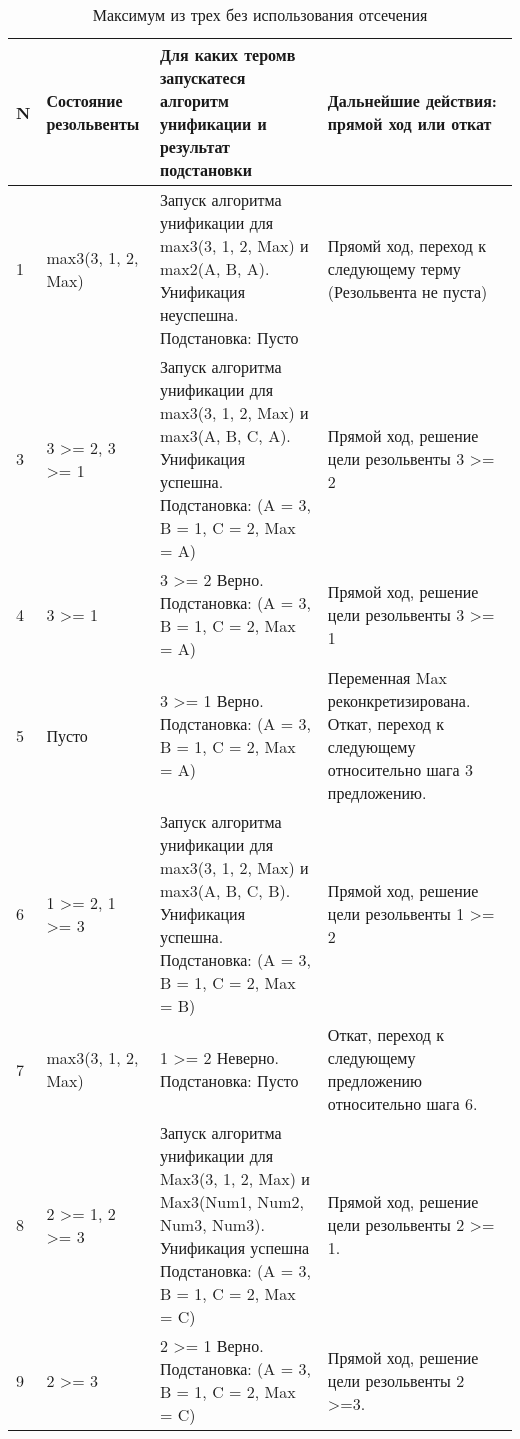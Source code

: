 \begin{table}[ht!]
	\centering
	\caption{Максимум из трех без использования отсечения}
	\label{decisions}
	\begin{tabular}{|p{0.3cm}|p{4cm}|p{7.5cm}|p{4cm}|}
			\hline
			\textbf{N} & \textbf{Состояние резольвенты} & \textbf{Для каких теромв запускатеся алгоритм унификации и результат подстановки} & \textbf{Дальнейшие действия: прямой ход или откат}\\
			\hline
			1 & max3(3, 1, 2, Max) & Запуск алгоритма унификации для max3(3, 1, 2, Max) и max2(A, B, A). Унификация неуспешна. Подстановка: Пусто & Пряомй ход, переход к следующему терму (Резольвента не пуста) \\
			\hline

			3 & 3 >= 2, 3 >= 1
			& Запуск алгоритма унификации для max3(3, 1, 2, Max)
			и max3(A, B, C, A).
			Унификация успешна. Подстановка: (A = 3, B = 1, C = 2, Max = A)
			& Прямой ход, решение цели
			резольвенты 3 >= 2 \\

			\hline

			4 & 3 >= 1
			& 3 >= 2 Верно. Подстановка: (A = 3, B = 1, C = 2, Max = A)
			& Прямой ход, решение цели
			резольвенты 3 >= 1\\

			\hline

			5 & Пусто
			& 3 >= 1 Верно. Подстановка: (A = 3, B = 1, C = 2, Max = A)
			& Переменная Max реконкретизирована.
			Откат, переход к следующему относительно шага 3
			предложению.\\

			\hline

			6 & 1 >= 2, 1 >= 3
			& Запуск алгоритма унификации для max3(3, 1, 2, Max) и
			max3(A, B, C, B).
			Унификация успешна. Подстановка: (A = 3, B = 1, C = 2, Max = B)
			& Прямой ход, решение цели
			резольвенты 1 >= 2\\
		
			\hline

			7 & max3(3, 1, 2, Max)
			& 1 >= 2 Неверно. Подстановка: Пусто
			& Откат, переход к следующему 
			предложению относительно шага 6.\\
		
			\hline

			8 & 2 >= 1, 2 >= 3
			& Запуск алгоритма унификации для Max3(3, 1, 2, Max) и
			Max3(Num1, Num2, Num3, Num3).
			Унификация успешна Подстановка: (A = 3, B = 1, C = 2, Max = C)
			& Прямой ход, решение цели
			резольвенты 2 >= 1.\\
		
			\hline

			9 & 2 >= 3
			& 2 >= 1 Верно. Подстановка: (A = 3, B = 1, C = 2, Max = C)
			& Прямой ход, решение цели
			резольвенты 2 >=3.\\
		
			


	\end{tabular}
\end{table}

